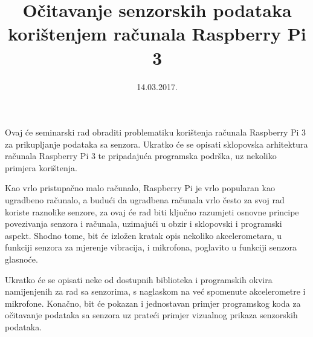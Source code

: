 \documentclass[12pt,a4paper]{article}
\begin{document}
	\title{Očitavanje senzorskih podataka korištenjem računala Raspberry Pi 3}


	\date{\vspace{-5ex} 14.03.2017.}
	\maketitle

Ovaj će seminarski rad obraditi problematiku korištenja računala Raspberry Pi 3 za prikupljanje podataka sa senzora. Ukratko će se opisati sklopovska arhitektura računala Raspberry Pi 3 te pripadajuća programska podrška, uz nekoliko primjera korištenja. \\ \par
Kao vrlo pristupačno malo računalo, Raspberry Pi je vrlo popularan kao ugradbeno računalo, a budući da ugradbena računala vrlo često za svoj rad koriste raznolike senzore, za ovaj će rad biti ključno razumjeti osnovne principe povezivanja senzora i računala, uzimajući u obzir i sklopovski i programski aspekt. Shodno tome, bit će izložen kratak opis nekoliko akcelerometara, u funkciji senzora za mjerenje vibracija, i mikrofona, poglavito u funkciji senzora glasnoće. \\ \par
Ukratko će se opisati neke od dostupnih biblioteka i programskih okvira namijenjenih za rad sa senzorima, s naglaskom na već spomenute akcelerometre i mikrofone. Konačno, bit će pokazan i jednostavan primjer programskog koda za očitavanje podataka sa senzora uz prateći primjer vizualnog prikaza senzorskih podataka. \\ \par
\end{document}
